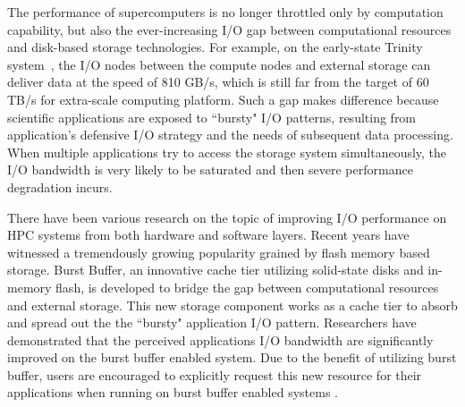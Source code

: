 The performance of supercomputers is no longer throttled only by computation capability,
but also the ever-increasing I/O gap 
between computational resources and disk-based storage technologies. 
For example, on the early-state Trinity system~\cite{TrinitySystem}, the I/O nodes between 
the compute nodes and external storage can deliver data at  the speed of 810 GB/s, 
which is still far from the target of 60 TB/s for extra-scale computing platform\cite{Shalf:HPCCS:2010}.
Such a gap makes difference because scientific applications are exposed to
``bursty" I/O patterns\cite{Carns:MSST:2011, Kim:PDSW:2010},
resulting from application's
defensive I/O strategy\cite{Latham:CSD:2012, Naik:ICPPW:2009, Dennis:CUG:2009}
and the needs of subsequent data processing.
When multiple applications try to access the storage system simultaneously, 
the I/O bandwidth is very likely to be saturated and then severe performance degradation incurs.


There have been various research on the topic of improving I/O performance on HPC systems from
both hardware and software layers.
Recent years have witnessed a tremendously growing popularity grained by flash memory  based storage.
Burst Buffer, an innovative cache tier utilizing solid-state disks and in-memory flash, 
is developed to bridge the gap between computational resources and external storage.
This new storage component works as a cache tier to absorb and spread out the  
the ``bursty" application I/O pattern\cite{Bent:HBP:2011, Grider:EXA:2010}.
Researchers\cite{Liu:MSST:2012} have demonstrated that the perceived applications I/O
bandwidth are significantly improved on the burst buffer enabled system.
Due to the benefit of utilizing burst buffer,
users are encouraged to explicitly request this new resource for 
their applications when running on burst buffer enabled systems \cite{apex-workflow}.

